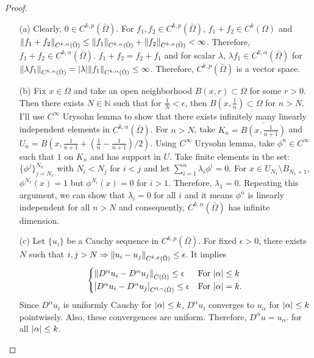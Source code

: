 \documentclass{article}
\begin{document}
\begin{proof}
\begin{enumerate}
\item[(a)] Clearly, $0\in C^{k,p}(\bar{\Omega})$. For $f_1, f_2\in C^{k,p}(\bar{\Omega})$, $f_1+f_2\in C^k(\Omega)$ and $\norm{f_1+f_2}_{C^{k,\alpha}(\bar{\Omega})}\leq \norm{f_1}_{C^{k,\alpha}(\bar{\Omega})}+\norm{f_2}_{C^{k,\alpha}(\bar{\Omega})}< \infty$. Therefore, $f_1+f_2\in {C^{k,\alpha}(\bar{\Omega})}$. $f_1+f_2=f_2+f_1$ and for scalar $\lambda$, $\lambda f_1\in {C^{k,\alpha}(\bar{\Omega})}$ for $\norm{\lambda f_1}_{C^{k,\alpha}(\bar{\Omega})}=\abs{\lambda}\norm{f_1}_{C^{k,\alpha}(\bar{\Omega})}\leq \infty$. Therefore, $C^{k,p}(\bar{\Omega})$ is a vector space.
\item[(b)] Fix $x\in \Omega$ and take an open neighborhood $B(x,r)\subset \Omega$ for some $r>0$. Then there exists $N\in \mathbb{N}$ such that for $\frac{1}{N}<\epsilon$, then $B(x, \frac{1}{n})\subset \Omega$ for $n>N$. I'll use $C^\infty$ Urysohn lemma to show that there exists infinitely many linearly independent elements in $C^{k,\alpha}(\bar{\Omega})$. For $n>N$, take $K_n=\overline{B(x, \frac{1}{n+1})}$ and $U_n=B\left(x, \frac{1}{n+1}+\left(\frac{1}{n}-\frac{1}{n+1}\right)/2\right)$. Using $C^\infty$ Urysohn lemma, take $\phi^n\in C^\infty$ such that $1$ on $K_n$ and has support in $U$. Take finite elements in the set: $\{\phi^j\}_{j=N_1}^{N_n}$ with $N_i<N_j$ for $i<j$ and let $\sum\limits_{i=1}^n \lambda_i \phi^i=0$. For $x\in U_{N_1}\setminus B_{N_1+1}$, $\phi^{N_1}(x)=1$ but $\phi^{N_i}(x)=0$ for $i>1$. Therefore, $\lambda_1=0$. Repeating this argument, we can show that $\lambda_i=0$ for all $i$ and it means $\phi^n$ is linearly independent for all $n>N$ and consequently, $C^{k, \alpha}(\bar{\Omega})$ has infinite dimension.
\item[(c)] Let $\{u_i\}$ be a Cauchy sequence in $C^{k,p}(\bar{\Omega})$. For fixed $\epsilon>0$, there exists $N$ such that $i,j>N\Rightarrow \norm{u_i-u_j}_{C^{k,p}(\bar{\Omega})}\leq \epsilon$. It implies
\begin{equation*}
\begin{cases}
\norm{D^\alpha u_i-D^\alpha u_j}_{C(\bar{\Omega})}\leq \epsilon & \text{For }\abs{\alpha}\leq k \\
\left[D^\alpha u_i-D^\alpha u_j\right]_{C^{0,\gamma}(\bar{\Omega})}\leq \epsilon & \text{For }\abs{\alpha}=k.
\end{cases}
\end{equation*}
Since $D^\alpha u_i$ is uniformly Cauchy for $\abs{\alpha}\leq k$, $D^\alpha u_i$ converges to $u_\alpha$ for $\abs{\alpha}\leq k$ pointwisely. Also, these convergences are uniform. Therefore, $D^\alpha u=u_\alpha$. for all $\abs{\alpha}\leq k$.


\end{enumerate}
\end{proof}
\end{document}
